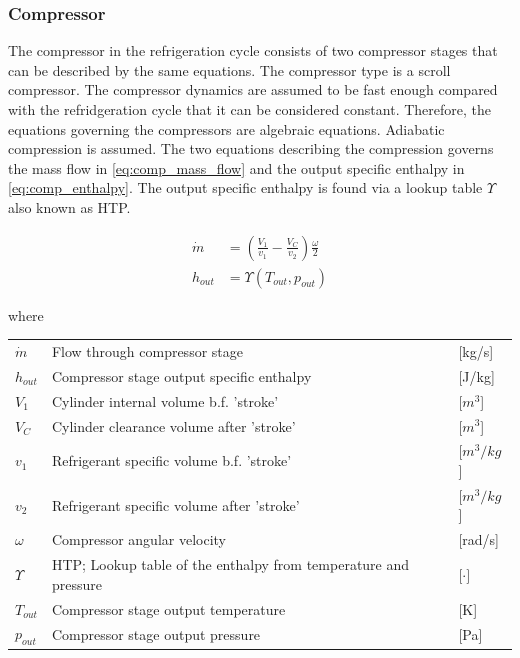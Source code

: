 \subsubsection{Compressor}
The compressor in the refrigeration cycle consists of two compressor stages that can be described by the same equations. The compressor type is a scroll compressor.
The compressor dynamics are assumed to be fast enough compared with the refridgeration cycle that it can be considered constant. Therefore, the equations governing the compressors are algebraic equations.
Adiabatic compression is assumed.
The two equations describing the compression governs the mass flow in \cref{eq:comp_mass_flow} and the output specific enthalpy in \cref{eq:comp_enthalpy}. The output specific enthalpy is found via a lookup table $ \Upsilon $ also known as HTP.

\begin{align}
	\dot{m} &= \left(\frac{V_1}{v_1} - \frac{V_C}{v_2}\right) \frac{\omega}{2} \label{eq:comp_mass_flow} \\
	h_{out} &= \Upsilon(T_{out}, p_{out}) \label{eq:comp_enthalpy}
\end{align}

where

\begin{center}
	\begin{tabular}{l p{8cm} l}
		$\dot{m}$  & Flow through compressor stage                                   & [\si{kg}/\si{s}]     \\
		$h_{out}$  & Compressor stage output specific enthalpy                       & [\si{J}/\si{kg}]     \\
		$V_1$      & Cylinder internal volume b.f. 'stroke'                          & [$\si{m}^3$]         \\
		$V_C$      & Cylinder clearance volume after 'stroke'                        & [$\si{m}^3$]         \\
		$v_1$      & Refrigerant specific volume b.f. 'stroke'                       & [$\si{m}^3/\si{kg}$] \\
		$v_2$      & Refrigerant specific volume after 'stroke'                      & [$\si{m}^3/\si{kg}$] \\
		$\omega$   & Compressor angular velocity                                     & [\si{rad}/\si{s}]    \\
		$\Upsilon$ & HTP; Lookup table of the enthalpy from temperature and pressure & [$\cdot]$            \\
		$T_{out}$  & Compressor stage output temperature                             & [\si{K}]             \\
		$p_{out}$  & Compressor stage output pressure                                & [\si{Pa}]
	\end{tabular}
\end{center}

